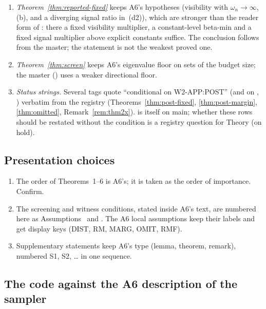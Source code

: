 \begin{enumerate}[label=\textbf{K\arabic*.},leftmargin=2.6em,itemsep=2pt]
  \item \emph{Theorem~\ref{thm:reported-fixed}} keeps A6's hypotheses (visibility with $\omega_n\to\infty$, (b),
    and a diverging signal ratio in~(d2)), which are stronger than the reader form of : there a
    fixed visibility multiplier, a constant-level beta-min and a fixed signal multiplier above explicit constants suffice. The
    conclusion follows from the master; the statement is not the weakest proved one.
  \item \emph{Theorem~\ref{thm:screen}} keeps A6's eigenvalue floor on sets of the budget size; the master
    () uses a weaker directional floor.
  \item \emph{Status strings.} Several tags quote ``conditional on W2-APP:POST'' (and on ,
    ) verbatim from the registry (Theorems~\ref{thm:post-fixed}, \ref{thm:post-margin},
    \ref{thm:omitted}, Remark~\ref{rem:thm2x}).  is itself  on main; whether these
    rows should be restated without the condition is a registry question for Theory (on hold).
\end{enumerate}

\subsection{Presentation choices}

\begin{enumerate}[label=\textbf{C\arabic*.},leftmargin=2.6em,itemsep=2pt]
  \item The order of Theorems~1--6 is A6's; it is taken as the order of importance. Confirm.
  \item The screening and witness conditions, stated inside A6's text, are numbered here as Assumptions~ and
    . The A6 local assumptions keep their labels and get display keys (DIST, RM, MARG, OMIT, RMF).
  \item Supplementary statements keep A6's type (lemma, theorem, remark), numbered S1, S2, \dots{} in one sequence.
\end{enumerate}

\subsection{The code against the A6 description of the sampler}

